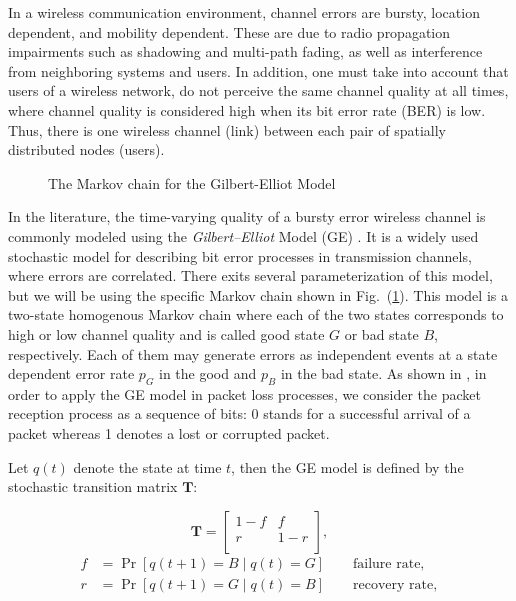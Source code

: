 In a wireless communication environment, channel errors are bursty, location
dependent, and mobility dependent. These are due to radio propagation
impairments such as shadowing and multi-path fading, as well as interference
from neighboring systems and users. In addition, one must take into account that
users of a wireless network, do not perceive the same channel quality at all
times, where channel quality is considered high when its bit error rate (BER) is
low. Thus, there is one wireless channel (link) between each pair of spatially
distributed nodes (users). 

\begin{figure}[htb]
  \centering
   
  \caption{The Markov chain for the Gilbert-Elliot Model}
  \label{fig:GE_FSM}
\end{figure}

In the literature, the time-varying quality of a bursty error wireless channel
is commonly modeled using the \textit{Gilbert–Elliot} Model (GE)
\cite{gilbert1960capacity, elliott1963estimates}. It is a widely used stochastic
model for describing bit error processes in transmission channels, where errors
are correlated. There exits several parameterization of this model, but we will
be using the specific Markov chain shown in Fig.~(\ref{fig:GE_FSM}). This model
is a two-state homogenous Markov chain where each of the two states corresponds
to high or low channel quality and is called good state $G$ or bad state $B$,
respectively. Each of them may generate errors as independent events at a state
dependent error rate $p_G$ in the good and $p_B$ in the bad state. As shown in
\cite{hasslinger2008gilbert}, in order to apply the GE model in packet loss
processes, we consider the packet reception process as a sequence of bits: 0
stands for a successful arrival of a packet whereas 1 denotes a lost or
corrupted packet.

Let $q(t)$ denote the state at time $t$, then the GE model is defined by the
stochastic transition matrix $\boldsymbol{T}$:

\begin{equation}
  \label{eq:GE_transition}
  \boldsymbol{T} = 
  \begin{bmatrix}
    1-f & f \\
    r & 1-r \\
  \end{bmatrix},
\end{equation}
\begin{align}
  f &= \Pr[q(t+1) = B \mid q(t) = G] \qquad \textrm{failure rate}, \\
  r &= \Pr[q(t+1) = G \mid q(t) = B] \qquad \textrm{recovery rate},
\end{align}

